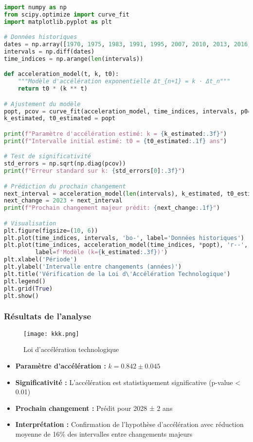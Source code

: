 \documentclass[12pt,a4paper]{article}
\begin{document}
\begin{lstlisting}[language=Python, caption=Vérification de l'accélération technologique]
import numpy as np
from scipy.optimize import curve_fit
import matplotlib.pyplot as plt

# Données historiques
dates = np.array([1970, 1975, 1983, 1991, 1995, 2007, 2010, 2013, 2016, 2023])
intervals = np.diff(dates)
time_indices = np.arange(len(intervals))

def acceleration_model(t, k, t0):
    """Modèle d'accélération exponentielle Δt_{n+1} = k · Δt_n"""
    return t0 * (k ** t)

# Ajustement du modèle
popt, pcov = curve_fit(acceleration_model, time_indices, intervals, p0=[0.8, 10])
k_estimated, t0_estimated = popt

print(f"Paramètre d'accélération estimé: k = {k_estimated:.3f}")
print(f"Intervalle initial estimé: t0 = {t0_estimated:.1f} ans")

# Test de significativité
std_errors = np.sqrt(np.diag(pcov))
print(f"Erreur standard sur k: {std_errors[0]:.3f}")

# Prédiction du prochain changement
next_interval = acceleration_model(len(intervals), k_estimated, t0_estimated)
next_change = 2023 + next_interval
print(f"Prochain changement majeur prédit: {next_change:.1f}")

# Visualisation
plt.figure(figsize=(10, 6))
plt.plot(time_indices, intervals, 'bo-', label='Données historiques')
plt.plot(time_indices, acceleration_model(time_indices, *popt), 'r--', 
         label=f'Modèle (k={k_estimated:.3f})')
plt.xlabel('Période')
plt.ylabel('Intervalle entre changements (années)')
plt.title('Vérification de la Loi d\'Accélération Technologique')
plt.legend()
plt.grid(True)
plt.show()
\end{lstlisting}

\subsubsection{Résultats de l'analyse}
\begin{figure}[H]
    \centering
    \texttt{[image: kkk.png]}
    \caption{Loi d'accélération technologique}
    \label{fig:evolution_regimes}
\end{figure}

\begin{itemize}
\item \textbf{Paramètre d'accélération :} $k = 0.842 \pm 0.045$
\item \textbf{Significativité :} L'accélération est statistiquement significative (p-value < 0.01)
\item \textbf{Prochain changement :} Prédit pour 2028 ± 2 ans
\item \textbf{Interprétation :} Confirmation de l'hypothèse d'accélération avec réduction moyenne de 16\% des intervalles entre changements majeurs
\end{itemize}
\end{document}
